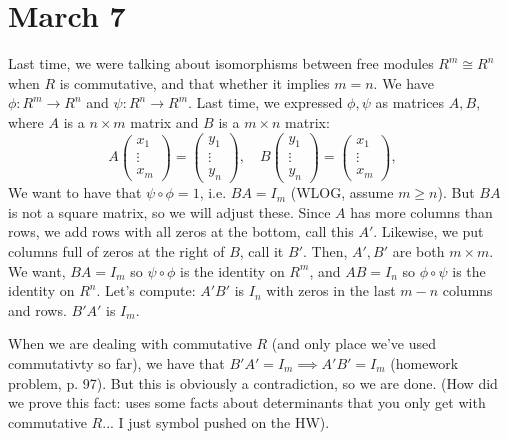 \documentclass{article}
\theoremstyle{plain}
\theoremstyle{remark}
\begin{document}
\section{March 7}
Last time, we were talking about isomorphisms between free modules
$R^m \cong R^n$ when $R$ is commutative,
and that whether it implies $m = n$.
We have $\phi \colon R^m \to R^n$ and $\psi \colon R^n \to R^m$.
Last time, we expressed $\phi,\psi$ as matrices $A,B$,
where $A$ is a $n \times m$ matrix and $B$ is a $m \times n$ matrix:
\[
	A \begin{pmatrix} x_1 \\ \vdots \\ x_m \end{pmatrix}
	= \begin{pmatrix} y_1 \\ \vdots \\ y_n \end{pmatrix}, \quad
	B \begin{pmatrix} y_1 \\ \vdots \\ y_n \end{pmatrix}
	= \begin{pmatrix} x_1 \\ \vdots \\ x_m \end{pmatrix}, \quad
\]
We want to have that $\psi \circ \phi = 1$,
i.e. $BA = I_m$ (WLOG, assume $m \geq n$).
But $BA$ is not a square matrix, so we will adjust these.
Since $A$ has more columns than rows, we add rows with all zeros at the bottom,
call this $A'$.
Likewise, we put columns full of zeros at the right of $B$, call it $B'$.
Then, $A',B'$ are both $m \times m$.
We want, $BA = I_m$ so $\psi \circ \phi$ is the identity on $R^m$,
and $AB = I_n$ so $\phi \circ \psi$ is the identity on $R^n$.
Let's compute: $A'B'$ is $I_n$ with zeros in the last $m-n$ columns and rows.
$B'A'$ is $I_m$.

When we are dealing with commutative $R$ (and only place we've used commutativty so far),
we have that $B'A' = I_m \implies A'B' = I_m$
(homework problem, p. 97).
But this is obviously a contradiction, so we are done.
(How did we prove this fact: uses some facts about determinants
that you only get with commutative $R$...
I just symbol pushed on the HW).
\end{document}
